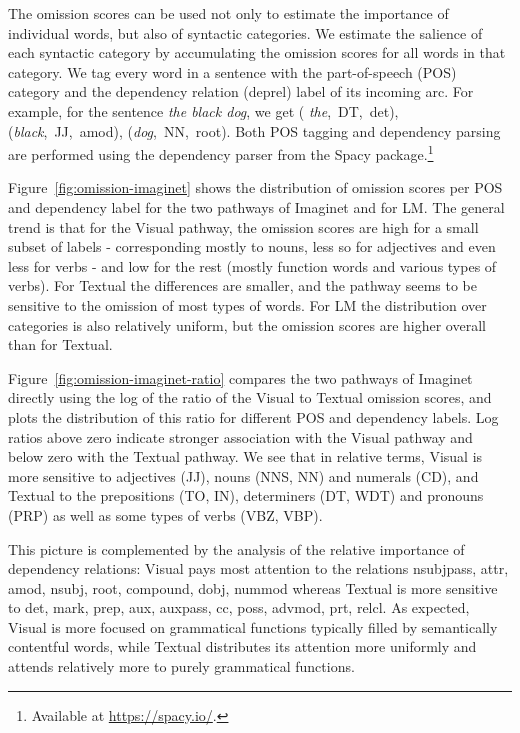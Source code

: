 The omission scores can be used not only to
estimate the importance of individual words, but also of syntactic
categories. We estimate the salience of each syntactic category by
accumulating the omission scores for all words in that category. We
tag every word in a sentence with the part-of-speech (POS) category
and the dependency relation (deprel) label of its incoming arc. For
example, for the sentence \emph{the black dog}, we get ({\it
  the},~DT,~det), 
({\it black},~JJ,~amod), ({\it dog},~NN,~root). 
Both POS tagging and dependency parsing are performed 
using the  dependency parser from the Spacy package.\footnote{Available at
  \url{https://spacy.io/}.} 


Figure~\ref{fig:omission-imaginet} shows the distribution of omission
scores per POS and dependency label for the two pathways of {\sc
  Imaginet} and for {\sc LM}.  The general trend is that for the {\sc
  Visual} pathway, the omission scores are high for a small subset of
labels - corresponding mostly to nouns, less so for adjectives and
even less for verbs - and low for the rest (mostly function words and
various types of verbs). For {\sc Textual} the differences
are \label{edit:textualomission} smaller, and the pathway seems to be
sensitive to the omission of most types of words.  For {\sc LM} the
distribution over categories is also relatively uniform, but the omission scores are higher
overall than for {\sc Textual}.

Figure~\ref{fig:omission-imaginet-ratio} compares the two pathways of
{\sc Imaginet} directly using the log of the ratio of the {\sc Visual}
to {\sc Textual} omission scores, and plots the distribution of this
ratio for different POS and dependency labels.  Log ratios above zero
indicate stronger association with the {\sc Visual} pathway and below
zero with the {\sc Textual} pathway. We see that in relative terms,
{\sc Visual} is more sensitive to adjectives (JJ), nouns (NNS, NN) and
numerals (CD), and {\sc Textual} to the prepositions (TO, IN),
determiners (DT, WDT) and pronouns (PRP) as well as some types of
verbs (VBZ, VBP).

This picture is complemented by the analysis of the
relative importance of dependency relations: {\sc Visual} pays most
attention to the relations {\sc nsubjpass, attr, amod, nsubj, root,
  compound, dobj, nummod}
whereas {\sc Textual} is more sensitive to {\sc det, mark, prep, aux,
  auxpass, cc, poss, advmod, prt, relcl}.
As expected, {\sc Visual} is more focused on grammatical
functions typically filled by semantically contentful words, while
{\sc Textual} distributes its attention more uniformly and 
attends relatively more to purely grammatical functions. 

